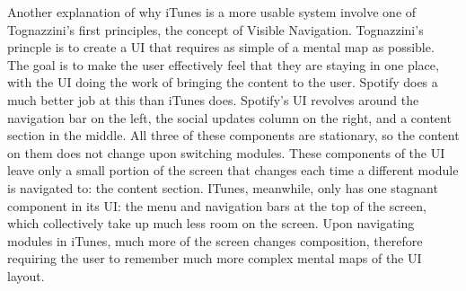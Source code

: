 \documentclass[12pt]{report}
\begin{document}
Another explanation of why iTunes is a more usable system involve one of Tognazzini's first principles, the concept of Visible Navigation. Tognazzini's princple is to create a UI that requires as simple of a mental map as possible. The goal is to make the user effectively feel that they are staying in one place, with the UI doing the work of bringing the content to the user. Spotify does a much better job at this than iTunes does. Spotify's UI revolves around the navigation bar on the left, the social updates column on the right, and a content section in the middle. All three of these components are stationary, so the content on them does not change upon switching modules. These components of the UI leave only a small portion of the screen that changes each time a different module is navigated to: the content section. ITunes, meanwhile, only has one stagnant component in its UI: the menu and navigation bars at the top of the screen, which collectively take up much less room on the screen. Upon navigating modules in iTunes, much more of the screen changes composition, therefore requiring the user to remember much more complex mental maps of the UI layout.
\end{document}
